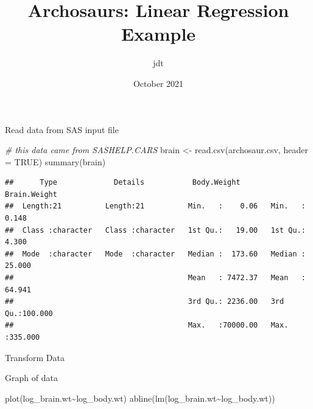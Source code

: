 \documentclass[
]{article}
\title{Archosaurs: Linear Regression Example}
\author{jdt}
\date{October 2021}
\newenvironment{Shaded}{\begin{snugshade}}{\end{snugshade}}
\newcommand{\AttributeTok}[1]{\textcolor[rgb]{0.77,0.63,0.00}{#1}}
\newcommand{\CommentTok}[1]{\textcolor[rgb]{0.56,0.35,0.01}{\textit{#1}}}
\newcommand{\ConstantTok}[1]{\textcolor[rgb]{0.00,0.00,0.00}{#1}}
\newcommand{\FunctionTok}[1]{\textcolor[rgb]{0.00,0.00,0.00}{#1}}
\newcommand{\NormalTok}[1]{#1}
\newcommand{\OtherTok}[1]{\textcolor[rgb]{0.56,0.35,0.01}{#1}}
\newcommand{\SpecialCharTok}[1]{\textcolor[rgb]{0.00,0.00,0.00}{#1}}
\newcommand{\StringTok}[1]{\textcolor[rgb]{0.31,0.60,0.02}{#1}}
\begin{document}
\maketitle

Read data from SAS input file

\begin{Shaded}
\begin{Highlighting}[]
\CommentTok{\# this data came from SASHELP.CARS}
\NormalTok{brain }\OtherTok{\textless{}{-}} \FunctionTok{read.csv}\NormalTok{(}\StringTok{\textquotesingle{}archosaur.csv\textquotesingle{}}\NormalTok{, }\AttributeTok{header =} \ConstantTok{TRUE}\NormalTok{)}
\FunctionTok{summary}\NormalTok{(brain)}
\end{Highlighting}
\end{Shaded}

\begin{verbatim}
##      Type             Details           Body.Weight        Brain.Weight    
##  Length:21          Length:21          Min.   :    0.06   Min.   :  0.148  
##  Class :character   Class :character   1st Qu.:   19.00   1st Qu.:  4.300  
##  Mode  :character   Mode  :character   Median :  173.60   Median : 25.000  
##                                        Mean   : 7472.37   Mean   : 64.941  
##                                        3rd Qu.: 2236.00   3rd Qu.:100.000  
##                                        Max.   :70000.00   Max.   :335.000
\end{verbatim}

Transform Data

\begin{Shaded}
\end{Shaded}

Graph of data

\begin{Shaded}
\begin{Highlighting}[]
\FunctionTok{plot}\NormalTok{(log\_brain.wt}\SpecialCharTok{\textasciitilde{}}\NormalTok{log\_body.wt)}
\FunctionTok{abline}\NormalTok{(}\FunctionTok{lm}\NormalTok{(log\_brain.wt}\SpecialCharTok{\textasciitilde{}}\NormalTok{log\_body.wt))}
\end{Highlighting}
\end{Shaded}
\end{document}
